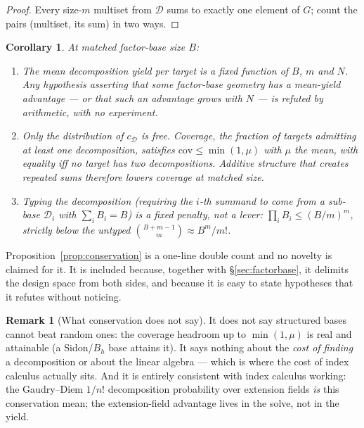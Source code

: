 \documentclass[11pt,a4paper]{article}
\theoremstyle{plain}
\newtheorem{corollary}[theorem]{Corollary}
\theoremstyle{definition}
\newtheorem{remark}[theorem]{Remark}
\begin{document}
\begin{proof}
Every size-$m$ multiset from $\mathcal{D}$ sums to exactly one element of $G$; count
the pairs (multiset, its sum) in two ways.
\end{proof}

\begin{corollary}\label{cor:conseq}
At matched factor-base size $B$:
\begin{enumerate}
\item The mean decomposition yield per target is a fixed function of $B$, $m$ and
  $N$. Any hypothesis asserting that some factor-base geometry has a mean-yield
  advantage --- or that such an advantage grows with $N$ --- is refuted by
  arithmetic, with no experiment.
\item Only the \emph{distribution} of $c_{\mathcal{D}}$ is free. Coverage, the
  fraction of targets admitting at least one decomposition, satisfies
  $\mathrm{cov} \le \min(1,\mu)$ with $\mu$ the mean, with equality iff no target
  has two decompositions. Additive structure that creates repeated sums therefore
  \emph{lowers} coverage at matched size.
\item Typing the decomposition (requiring the $i$-th summand to come from a
  sub-base $\mathcal{D}_i$ with $\sum_i B_i = B$) is a fixed penalty, not a lever:
  $\prod_i B_i \le (B/m)^m$, strictly below the untyped $\binom{B+m-1}{m} \approx
  B^m/m!$.
\end{enumerate}
\end{corollary}

Proposition~\ref{prop:conservation} is a one-line double count and no novelty is
claimed for it. It is included because, together with
\S\ref{sec:factorbase}, it delimits the design space from both sides, and because
it is easy to state hypotheses that it refutes without noticing.

\begin{remark}[What conservation does not say]
It does not say structured bases cannot beat random ones: the coverage headroom
up to $\min(1,\mu)$ is real and attainable (a Sidon/$B_h$ base attains it). It
says nothing about the \emph{cost of finding} a decomposition or about the linear
algebra --- which is where the cost of index calculus actually sits. And it is
entirely consistent with index calculus working: the Gaudry--Diem $1/n!$
decomposition probability over extension fields \emph{is} this conservation mean;
the extension-field advantage lives in the solve, not in the yield.
\end{remark}
\end{document}
